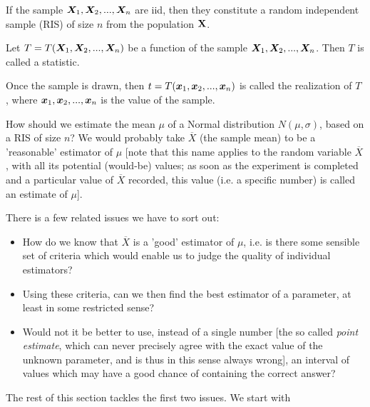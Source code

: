 \begin{definition}{}{}
    If the sample $\boldsymbol{X}_1,\boldsymbol{X}_2,..., \boldsymbol{X}_n$ are iid, then they constitute
a random independent sample (RIS) of size $n$ from the population $\bold{X}$.
\end{definition}

\begin{definition}{}{}
    Let $T = T(\boldsymbol{X}_1,\boldsymbol{X}_2,..., \boldsymbol{X}_n)$ be a function of the sample 
    $\boldsymbol{X}_1,\boldsymbol{X}_2,..., \boldsymbol{X}_n$. Then $T$ is called a statistic.
\end{definition}
\begin{remark}
    Once the sample is drawn, then $t=T(\boldsymbol{x}_1,\boldsymbol{x}_2,..., \boldsymbol{x}_n)$ is called the
    realization of $T$ , where $\boldsymbol{x}_1,\boldsymbol{x}_2,..., \boldsymbol{x}_n$ is the value of the sample.
\end{remark}

\begin{example}{}{}
    How should we estimate the mean $\mu$ of a Normal distribution
    $N (\mu, \sigma)$, based on a RIS of size $n$? We would probably take $\overline{X}$ 
    (the sample mean) to be a 'reasonable' estimator of $\mu$ 
    [note that this name applies to the random variable $\overline{X}$, 
    with all its potential (would-be) values; as soon as
    the experiment is completed and a particular value of $\overline{X}$ 
    recorded, this value (i.e. a specific number) is called an estimate of $\mu$].
\end{example}

There is a few related issues we have to sort out:
\begin{itemize}
    \item How do we know that $\overline{X}$ is a 'good' estimator of $\mu$, i.e. 
    is there some sensible set of criteria which would enable us to judge the quality of individual
    estimators?
    \item Using these criteria, can we then find the best estimator of a parameter, at
    least in some restricted sense?
    \item Would not it be better to use, instead of a single number [the so called
    {\it point estimate}, which can never precisely agree with the exact value of
    the unknown parameter, and is thus in this sense always wrong], an interval
    of values which may have a good chance of containing the correct answer?
\end{itemize}
The rest of this section tackles the first two issues. We start with

